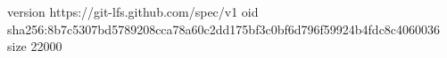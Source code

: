 version https://git-lfs.github.com/spec/v1
oid sha256:8b7c5307bd5789208cca78a60c2dd175bf3c0bf6d796f59924b4fdc8c4060036
size 22000
